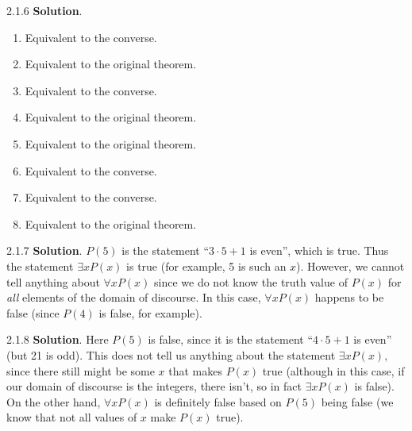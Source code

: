 \documentclass[11pt,]{book}
\theoremstyle{ptxplainnotitle}
\theoremstyle{ptxplaintitle}
\theoremstyle{ptxdefinitionnotitle}
\theoremstyle{ptxdefinitiontitle}
\theoremstyle{ptxdefinitionnotitle}
\theoremstyle{ptxdefinitiontitle}
\theoremstyle{ptxdefinitionnotitle}
\theoremstyle{ptxdefinitiontitle}
\theoremstyle{ptxdefinitiontitlenonumber}
\theoremstyle{ptxdefinitiontitlenonumber}
\numberwithin{equation}{chapter}
\begin{document}
\begin{divisionexercise}{2.1.6}
\textbf{Solution}.\quad%
\hypertarget{p-2153}{}%
\leavevmode%
\begin{enumerate}[label=\alph*.]
\item\hypertarget{li-1049}{}\hypertarget{p-2154}{}%
Equivalent to the converse.%
\item\hypertarget{li-1050}{}\hypertarget{p-2155}{}%
Equivalent to the original theorem.%
\item\hypertarget{li-1051}{}\hypertarget{p-2156}{}%
Equivalent to the converse.%
\item\hypertarget{li-1052}{}\hypertarget{p-2157}{}%
Equivalent to the original theorem.%
\item\hypertarget{li-1053}{}\hypertarget{p-2158}{}%
Equivalent to the original theorem.%
\item\hypertarget{li-1054}{}\hypertarget{p-2159}{}%
Equivalent to the converse.%
\item\hypertarget{li-1055}{}\hypertarget{p-2160}{}%
Equivalent to the converse.%
\item\hypertarget{li-1056}{}\hypertarget{p-2161}{}%
Equivalent to the original theorem.%
\end{enumerate}
%
\end{divisionexercise}%
\begin{divisionexercise}{2.1.7}
\textbf{Solution}.\quad%
\hypertarget{p-2175}{}%
\(P(5)\) is the statement ``\(3\cdot 5 + 1\) is even'', which is true.  Thus the statement \(\exists x P(x)\) is true (for example, 5 is such an \(x\)).  However, we cannot tell anything about \(\forall x P(x)\) since we do not know the truth value of \(P(x)\) for \emph{all} elements of the domain of discourse.  In this case, \(\forall x P(x)\) happens to be false (since \(P(4)\) is false, for example).%
\end{divisionexercise}%
\begin{divisionexercise}{2.1.8}
\textbf{Solution}.\quad%
\hypertarget{p-2189}{}%
Here \(P(5)\) is false, since it is the statement ``\(4\cdot 5 + 1\) is even'' (but 21 is odd).  This does not tell us anything about the statement \(\exists x P(x)\text{,}\) since there still might be some \(x\) that makes \(P(x)\) true (although in this case, if our domain of discourse is the integers, there isn't, so in fact \(\exists x P(x)\) is false).  On the other hand, \(\forall x P(x)\) is definitely false based on \(P(5)\) being false (we know that not all values of \(x\) make \(P(x)\) true).%
\end{divisionexercise}%
\end{document}
